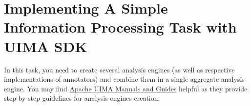 
\chapter{Implementing A Simple Information Processing Task with UIMA SDK}

In this task, you need to 
create several analysis engines (as well as
respective implementations of annotators) 
and combine them in a single aggregate analysis engine.
You may find \href{http://uima.apache.org/documentation.html#manuals_and_guides}{Apache UIMA Manuals and
Guides}
helpful as they provide step-by-step guidelines for analysis engines creation.






